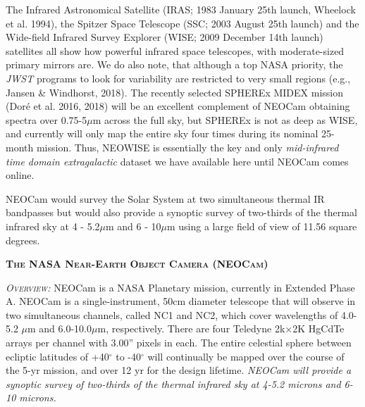 \documentclass[12pt]{article}
\begin{document}
\smallskip
\noindent
The Infrared Astronomical Satellite (IRAS; 1983 January 25th launch, Wheelock et al. 1994), the Spitzer Space Telescope (SSC; 2003 August 25th launch) and the Wide-field Infrared Survey Explorer (WISE; 2009 December 14th launch) satellites all show how powerful infrared space telescopes, with moderate-sized primary mirrors are. We do also note, that although a top NASA priority, the {\it JWST} programs to look for variability are restricted to very small regions (e.g., Jansen \&  Windhorst, 2018). The recently selected SPHEREx MIDEX mission (Dor{\'e} et al. 2016, 2018) will be an excellent complement of NEOCam
obtaining spectra over 0.75-5$\mu$m across the full sky, but SPHEREx is not as deep as WISE, and currently will only map the entire sky four times during its nominal 25-month mission. Thus, NEOWISE is essentially the key and only {\it mid-infrared time domain extragalactic} dataset we have available here until NEOCam comes online.

\smallskip
\smallskip
\noindent
NEOCam would survey the Solar System at two simultaneous thermal IR
bandpasses but would also provide a synoptic survey of two-thirds of
the thermal infrared sky at 4 - 5.2$\mu$m and 6 - 10$\mu$m using a
large field of view of 11.56 square degrees.


\smallskip
\smallskip
\noindent
{\bfseries \textsc{\textcolor{Cerulean}{The NASA Near-Earth Object Camera (NEOCam)}}}

\smallskip
\noindent
\textsl{\textsc{Overview:}}
NEOCam is a NASA Planetary mission, currently in Extended Phase A.  
NEOCam is a
single-instrument, 50cm diameter telescope that will observe in two
simultaneous channels, called NC1 and NC2, which cover wavelengths of
4.0-5.2 $\mu$m and 6.0-10.0$\mu$m, respectively. There are four Teledyne
2k$\times$2K HgCdTe arrays per channel with 3.00'' pixels in each. The entire
celestial sphere between ecliptic latitudes of +40$^{\circ}$ to -40$^{\circ}$ will
continually be mapped over the course of the 5-yr mission, and over 12
yr for the design lifetime. 
{\it NEOCam will provide a synoptic survey of two-thirds of the thermal infrared sky at 4-5.2 microns and 6-10 microns.}
\end{document}
